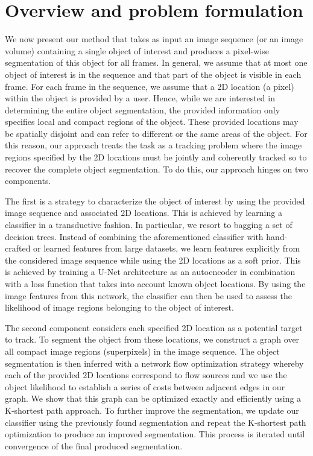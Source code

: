 \section{Overview and problem formulation}
\label{sec:overview}

We now present our method that takes as input an image sequence (or an image volume) containing a single object of interest and produces a pixel-wise segmentation of this object for all frames. In general, we assume that at most one object of interest is in the sequence and that part of the object is visible in each frame. For each frame in the sequence, we assume that a 2D location (\ie a pixel) within the object is provided by a user.
Hence, while we are interested in determining the entire object segmentation, the provided information only specifies local and compact regions of the object. These provided locations may be spatially disjoint and can refer to different or the same areas of the object. For this reason, our approach treats the task as a tracking problem where the image regions specified by the 2D locations must be jointly and coherently tracked so to recover the complete object segmentation. To do this, our approach hinges on two components. 

The first is a strategy to characterize the object of interest by using the provided image sequence and associated 2D locations. This is achieved by learning a classifier in a transductive fashion. In particular, we resort to bagging a set of decision trees. Instead of combining the aforementioned classifier with hand-crafted or learned features from large datasets, we learn features explicitly from the considered image sequence while using the 2D locations as a soft prior. This is achieved by training a U-Net architecture \cite{ronneberger15} as an autoencoder in combination with a loss function that takes into account known object locations. By using the image features from this network, the classifier can then be used to assess the likelihood of image regions belonging to the object of interest.

The second component considers each specified 2D location as a potential target to track. To segment the object from these locations, we construct a graph over all compact image regions (\ie superpixels) in the image sequence.
The object segmentation is then inferred with a network flow optimization strategy whereby each of the provided 2D locations correspond to flow sources and we use the object likelihood to establish a series of costs between adjacent edges in our graph. We show that this graph can be optimized exactly and efficiently using a K-shortest path approach. To further improve the segmentation, we update our classifier using the previously found segmentation and repeat the K-shortest path optimization to produce an improved segmentation. This process is iterated until convergence of the final produced segmentation.

